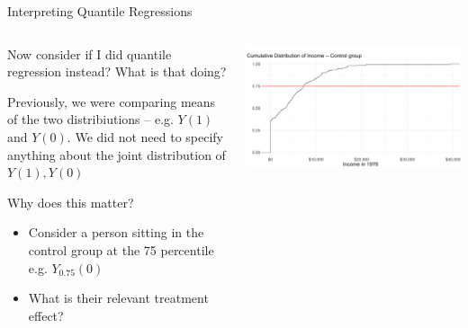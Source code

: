 \documentclass[notes,11pt, aspectratio=169]{beamer}
\newenvironment{wideitemize}{\itemize\addtolength{\itemsep}{10pt}}{\enditemize}
\begin{document}
\begin{frame}{Interpreting Quantile Regressions}
  \begin{columns}[T] %
    \begin{column}{.5\textwidth}
      \begin{wideitemize}
      \item Now consider if I did quantile regression instead? What is
        that doing?
      \item Previously, we were comparing means of the two
        distribiutions -- e.g. $Y(1)$ and $Y(0)$.  We did not need to
        specify anything about the joint distribution of $Y(1),Y(0)$
      \item Why does this matter?
        \begin{itemize}
        \item Consider a person sitting in the control group at the 75
          percentile e.g. $Y_{0.75}(0)$
        \item What is their relevant treatment effect?
        \end{itemize}
      \end{wideitemize}
    \end{column}%
    \hfill%
    \begin{column}{.5\textwidth}
      \includegraphics[width=\linewidth]{quantile_cdf_nsw_control75.png}
    \end{column}
  \end{columns}
\end{frame}
\end{document}
